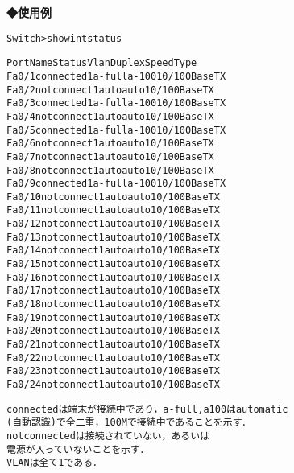 {\bf ◆使用例}
\begin{center}
\begin{breakbox}
\begin{alltt}
Switch>show int status

Port      Name               Status       Vlan       Duplex  Speed Type
Fa0/1                        connected    1          a-full  a-100 10/100BaseTX
Fa0/2                        notconnect   1            auto   auto 10/100BaseTX
Fa0/3                        connected    1          a-full  a-100 10/100BaseTX
Fa0/4                        notconnect   1            auto   auto 10/100BaseTX
Fa0/5                        connected    1          a-full  a-100 10/100BaseTX
Fa0/6                        notconnect   1            auto   auto 10/100BaseTX
Fa0/7                        notconnect   1            auto   auto 10/100BaseTX
Fa0/8                        notconnect   1            auto   auto 10/100BaseTX
Fa0/9                        connected    1          a-full  a-100 10/100BaseTX
Fa0/10                       notconnect   1            auto   auto 10/100BaseTX
Fa0/11                       notconnect   1            auto   auto 10/100BaseTX
Fa0/12                       notconnect   1            auto   auto 10/100BaseTX
Fa0/13                       notconnect   1            auto   auto 10/100BaseTX
Fa0/14                       notconnect   1            auto   auto 10/100BaseTX
Fa0/15                       notconnect   1            auto   auto 10/100BaseTX
Fa0/16                       notconnect   1            auto   auto 10/100BaseTX
Fa0/17                       notconnect   1            auto   auto 10/100BaseTX
Fa0/18                       notconnect   1            auto   auto 10/100BaseTX
Fa0/19                       notconnect   1            auto   auto 10/100BaseTX
Fa0/20                       notconnect   1            auto   auto 10/100BaseTX
Fa0/21                       notconnect   1            auto   auto 10/100BaseTX
Fa0/22                       notconnect   1            auto   auto 10/100BaseTX
Fa0/23                       notconnect   1            auto   auto 10/100BaseTX
Fa0/24                       notconnect   1            auto   auto 10/100BaseTX

connected は端末が接続中であり，a-full, a100 は automatic
(自動認識)で全二重，100M で接続中であることを示す．
not connected は接続されていない，あるいは
電源が入っていないことを示す．
VLAN は全て 1 である．

\end{alltt}
\end{breakbox}
\end{center}
                
